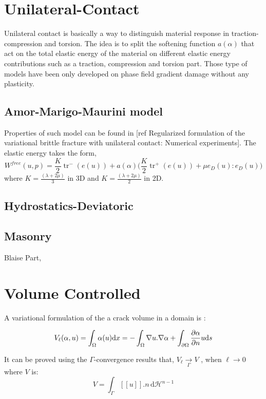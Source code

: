 \documentclass[10pt,oneside]{memoir}
\let\div\relax
\DeclareMathOperator*{\div}{div}
\DeclareMathOperator{\tr}{tr}
\newcommand{\jump}[1]{\ensuremath{[\![#1]\!]} }
\begin{document}
\section{Unilateral-Contact}

Unilateral contact is basically a way to distinguish material response in traction-compression and torsion. The idea is to split the softening function $a(\alpha)$ that act on the total elastic energy of the material on different elastic energy contributions such as a traction, compression and torsion part. Those type of models have been only developed on phase field gradient damage without any plasticity.

\subsection{Amor-Marigo-Maurini model}

Properties of such model can be found in [ref Regularized formulation of the variational brittle fracture with unilateral contact: Numerical experiments].
The elastic energy takes the form,
$$W^{free}(u,p)= \frac{K}{2} \tr^-({e(u)}) + a(\alpha) \Big( \frac{K}{2}\tr ^+({e(u)}) + \mu e_D(u):e_D(u) \Big) $$ where $K=\frac{(\lambda+2\mu)}{3}$ in 3D and $K=\frac{(\lambda+2\mu)}{2}$ in 2D.

\subsection{Hydrostatics-Deviatoric}



\subsection{Masonry}

Blaise Part,




\section{Volume Controlled}


A variational formulation of the a crack volume in a domain is :

$$ V_{\ell}(\alpha,u)=\int_{\Omega} \alpha \div{(u)} \mathrm{d}x= - \int_{\Omega} \nabla u . \nabla \alpha + \int_{\partial \Omega} \frac{\partial \alpha}{\partial n} u \mathrm{d}s$$

It can be proved using the $\Gamma$-convergence results that,
$V_{\ell} \underset{\Gamma}{\longrightarrow} V$ , when $\ell \rightarrow 0$ where $V$ is:
$$ V = \int_{\Gamma} \jump{u} .n\, \mathrm{d}\mathcal{H}^{n-1}$$
\end{document}
